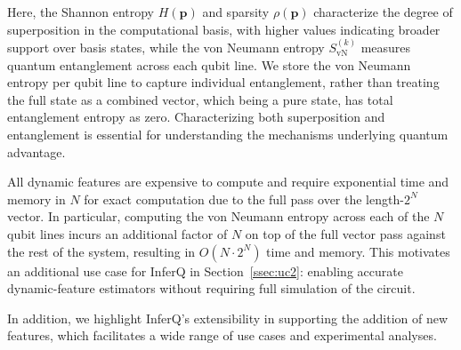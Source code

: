 Here, the Shannon entropy $H(\mathbf{p})$ and sparsity $\rho(\mathbf{p})$ characterize the degree of superposition in the computational basis, with higher values indicating broader support over basis states, while the von Neumann entropy $S_{\mathrm{vN}}^{(k)}$ measures quantum entanglement across each qubit line. We store the von Neumann entropy per qubit line to capture individual entanglement, rather than treating the full state as a combined vector, which being a pure state, has total entanglement entropy as zero. Characterizing both superposition and entanglement is essential for understanding the mechanisms underlying quantum advantage.

All dynamic features are expensive to compute and require exponential time and memory in $N$ for exact computation due to the full pass over the length-$2^{N}$ vector. In particular, computing the von Neumann entropy across each of the $N$ qubit lines incurs an additional factor of $N$ on top of the full vector pass against the rest of the system, resulting in $O(N \cdot 2^N)$ time and memory. This motivates an additional use case for InferQ in Section~\ref{ssec:uc2}: enabling accurate dynamic-feature estimators without requiring full simulation of the circuit. 

In addition, we highlight InferQ’s extensibility in supporting the addition of new features, which facilitates a wide range of use cases and experimental analyses.






